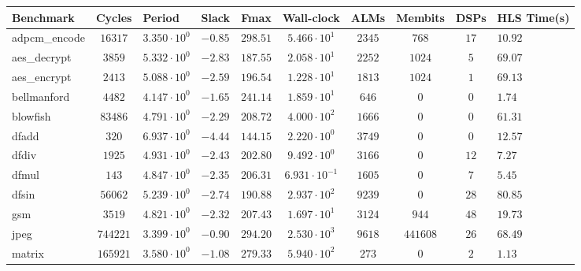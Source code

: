 \begin{tabular}{|l|c|HHc|c|c|c|cH|}
\hline
Benchmark     & Cycles       & Period                 & Slack     & Fmax       & Wall-clock              & ALMs      & Membits    & DSPs    & HLS Time(s) \\
\hline
adpcm\_encode & $ 16317    $ & $ 3.350 \cdot 10^{0} $ & $ -0.85 $ & $ 298.51 $ & $ 5.466 \cdot 10^{1}  $ & $ 2345  $ & $ 768    $ & $ 17  $ & $ 10.92   $ \\
aes\_decrypt  & $ 3859     $ & $ 5.332 \cdot 10^{0} $ & $ -2.83 $ & $ 187.55 $ & $ 2.058 \cdot 10^{1}  $ & $ 2252  $ & $ 1024   $ & $ 5   $ & $ 69.07   $ \\
aes\_encrypt  & $ 2413     $ & $ 5.088 \cdot 10^{0} $ & $ -2.59 $ & $ 196.54 $ & $ 1.228 \cdot 10^{1}  $ & $ 1813  $ & $ 1024   $ & $ 1   $ & $ 69.13   $ \\
bellmanford   & $ 4482     $ & $ 4.147 \cdot 10^{0} $ & $ -1.65 $ & $ 241.14 $ & $ 1.859 \cdot 10^{1}  $ & $ 646   $ & $ 0      $ & $ 0   $ & $ 1.74    $ \\
blowfish      & $ 83486    $ & $ 4.791 \cdot 10^{0} $ & $ -2.29 $ & $ 208.72 $ & $ 4.000 \cdot 10^{2}  $ & $ 1666  $ & $ 0      $ & $ 0   $ & $ 61.31   $ \\
dfadd         & $ 320      $ & $ 6.937 \cdot 10^{0} $ & $ -4.44 $ & $ 144.15 $ & $ 2.220 \cdot 10^{0}  $ & $ 3749  $ & $ 0      $ & $ 0   $ & $ 12.57   $ \\
dfdiv         & $ 1925     $ & $ 4.931 \cdot 10^{0} $ & $ -2.43 $ & $ 202.80 $ & $ 9.492 \cdot 10^{0}  $ & $ 3166  $ & $ 0      $ & $ 12  $ & $ 7.27    $ \\
dfmul         & $ 143      $ & $ 4.847 \cdot 10^{0} $ & $ -2.35 $ & $ 206.31 $ & $ 6.931 \cdot 10^{-1} $ & $ 1605  $ & $ 0      $ & $ 7   $ & $ 5.45    $ \\
dfsin         & $ 56062    $ & $ 5.239 \cdot 10^{0} $ & $ -2.74 $ & $ 190.88 $ & $ 2.937 \cdot 10^{2}  $ & $ 9239  $ & $ 0      $ & $ 28  $ & $ 80.85   $ \\
gsm           & $ 3519     $ & $ 4.821 \cdot 10^{0} $ & $ -2.32 $ & $ 207.43 $ & $ 1.697 \cdot 10^{1}  $ & $ 3124  $ & $ 944    $ & $ 48  $ & $ 19.73   $ \\
jpeg          & $ 744221   $ & $ 3.399 \cdot 10^{0} $ & $ -0.90 $ & $ 294.20 $ & $ 2.530 \cdot 10^{3}  $ & $ 9618  $ & $ 441608 $ & $ 26  $ & $ 68.49   $ \\
matrix        & $ 165921   $ & $ 3.580 \cdot 10^{0} $ & $ -1.08 $ & $ 279.33 $ & $ 5.940 \cdot 10^{2}  $ & $ 273   $ & $ 0      $ & $ 2   $ & $ 1.13    $ \\

\end{tabular}
